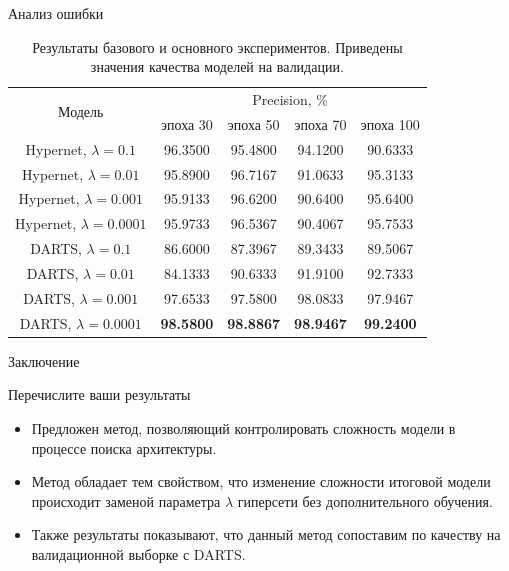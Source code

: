 \documentclass{beamer}
\begin{document}
\begin{frame}{Анализ ошибки}

\begin{table}[H]
\centering
	\begin{tabular}{ |c|c|c|c|c| }
	\hline
	 \multirow{2}{*}{Модель} & \multicolumn{4}{c|}{Precision, \%} \\ \cline{2-5}
	 		& эпоха 30 & эпоха 50 & эпоха 70 & эпоха 100\\
	 \hline
 	Hypernet, $\lambda = 0.1$ &96.3500 & 95.4800 & 94.1200 & 90.6333  \\ 
 	Hypernet, $\lambda = 0.01$ &95.8900 & 96.7167& 91.0633 & 95.3133 \\ 
 	Hypernet, $\lambda = 0.001$ &95.9133 & 96.6200 & 90.6400 & 95.6400 \\ 
 	Hypernet, $\lambda = 0.0001$ &95.9733 & 96.5367 & 90.4067 & 95.7533\\
 	\hline
 	DARTS, $\lambda = 0.1$&86.6000 &87.3967 & 89.3433 & 89.5067 \\
 	DARTS, $\lambda = 0.01$& 84.1333 & 90.6333 &91.9100 & 92.7333\\
 	DARTS, $\lambda = 0.001$&97.6533 & 97.5800 & 98.0833 & 97.9467 \\
 	DARTS, $\lambda = 0.0001$& \textbf{98.5800} &  \textbf{98.8867}&\textbf{98.9467}&\textbf{99.2400} \\
 	\hline
\end{tabular}
\caption{Результаты базового и основного экспериментов. Приведены значения качества моделей на валидации.}
\end{table}

\end{frame}
\begin{frame}{Заключение}
    \begin{block}{Перечислите ваши результаты}
    \begin{itemize}
        \item Предложен метод, позволяющий контролировать сложность модели в процессе поиска архитектуры.
        \item Метод обладает тем свойством, что изменение сложности итоговой модели происходит заменой параметра $\lambda$ гиперсети без дополнительного обучения.
        \item Также результаты показывают, что данный метод сопоставим по качеству на валидационной выборке с DARTS.
    \end{itemize}
    \end{block}
\end{frame}
\end{document}
